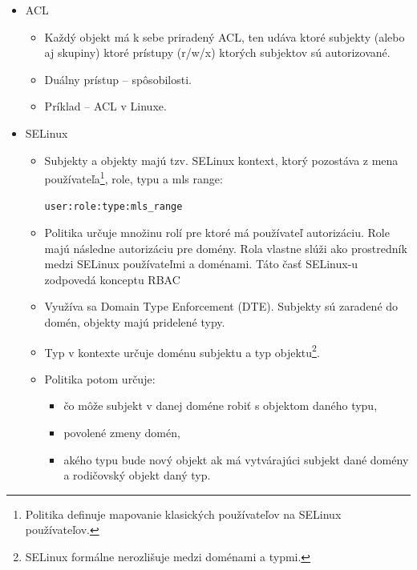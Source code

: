 \documentclass[12pt,a4paper]{article}
\begin{document}
{\begin{itemize}
\begin{itemize}
            \item Z role možno odobrať alebo do nej pridať prístupové práva. Napríklad pri spustení nového informačného systému treba napr. administrátorom prideliť prístup. 
            \item Tento model pomáha dodržiavať princípy: least privilege principle, separation of concerns\footnote{Jeden používateľ nemôže mať dve konfliktné role, napr. administrátor a zároveň interný auditor.} a abstrakcia údajov\footnote{Namiesto klasických read, write, execute vieme mať abstraktnejšie oprávnenia, napr. povolenie použiť kreditnú kartu.}
            \item Príklad -- Súčasťou SELinux-u je aj RBAC.
        \end{itemize}
        \item ACL
        \begin{itemize}
            \item Každý objekt má k sebe priradený ACL, ten udáva ktoré subjekty (alebo aj skupiny) ktoré prístupy (r/w/x) ktorých subjektov sú autorizované.
            \item Duálny prístup -- spôsobilosti. 
            \item Príklad -- ACL v Linuxe.
        \end{itemize}
        \item SELinux
        \begin{itemize} 
            \item Subjekty a objekty majú tzv. SELinux kontext, ktorý pozostáva z mena používateľa\footnote{Politika definuje mapovanie klasických používateľov na SELinux používateľov.}, role, typu a mls range:

            \texttt{user:role:type:mls\_range}

            \item Politika určuje množinu rolí pre ktoré má používateľ autorizáciu. Role majú následne autorizáciu pre domény. Rola vlastne slúži ako prostredník medzi SELinux používateľmi a doménami. Táto časť SELinux-u zodpovedá konceptu RBAC
            \item Využíva sa Domain Type Enforcement (DTE). Subjekty sú zaradené do domén, objekty majú pridelené typy.
            \item Typ v kontexte určuje doménu subjektu a typ objektu\footnote{SELinux formálne nerozlišuje medzi doménami a typmi.}.  
            \item Politika potom určuje: 
            \begin{itemize}
                \item čo môže subjekt v danej doméne robiť s objektom daného typu,
                \item povolené zmeny domén,
                \item akého typu bude nový objekt ak má vytvárajúci subjekt dané domény a rodičovský objekt daný typ.
            \end{itemize}
            

\end{itemize}
\end{itemize}}
\end{document}
